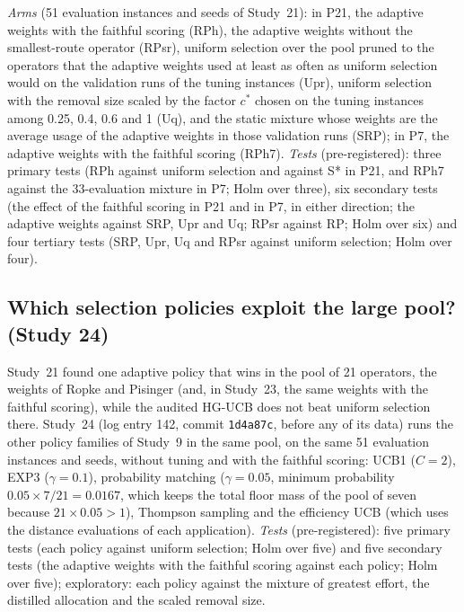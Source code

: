 \emph{Arms} (51 evaluation instances and seeds of Study~21): in P21, the adaptive weights with the faithful scoring (RPh), the adaptive weights without the smallest-route operator (RPsr), uniform selection over the pool pruned to the operators that the adaptive weights used at least as often as uniform selection would on the validation runs of the tuning instances (Upr), uniform selection with the removal size scaled by the factor $c^*$ chosen on the tuning instances among 0.25, 0.4, 0.6 and 1 (Uq), and the static mixture whose weights are the average usage of the adaptive weights in those validation runs (SRP); in P7, the adaptive weights with the faithful scoring (RPh7). \emph{Tests} (pre-registered): three primary tests (RPh against uniform selection and against S* in P21, and RPh7 against the 33-evaluation mixture in P7; Holm over three), six secondary tests (the effect of the faithful scoring in P21 and in P7, in either direction; the adaptive weights against SRP, Upr and Uq; RPsr against RP; Holm over six) and four tertiary tests (SRP, Upr, Uq and RPsr against uniform selection; Holm over four).

\subsection{Which selection policies exploit the large pool? (Study 24)}\label{sec:s24design}
Study~21 found one adaptive policy that wins in the pool of 21 operators, the weights of Ropke and Pisinger (and, in Study~23, the same weights with the faithful scoring), while the audited HG-UCB does not beat uniform selection there. Study~24 (log entry 142, commit \texttt{1d4a87c}, before any of its data) runs the other policy families of Study~9 in the same pool, on the same 51 evaluation instances and seeds, without tuning and with the faithful scoring: UCB1 ($C=2$), EXP3 ($\gamma=0.1$), probability matching ($\gamma=0.05$, minimum probability $0.05\times7/21=0.0167$, which keeps the total floor mass of the pool of seven because $21\times0.05>1$), Thompson sampling and the efficiency UCB (which uses the distance evaluations of each application). \emph{Tests} (pre-registered): five primary tests (each policy against uniform selection; Holm over five) and five secondary tests (the adaptive weights with the faithful scoring against each policy; Holm over five); exploratory: each policy against the mixture of greatest effort, the distilled allocation and the scaled removal size.

